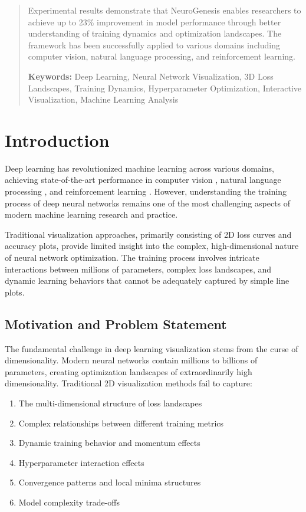 \documentclass[12pt,a4paper]{article}
\begin{document}
\begin{abstract}
Experimental results demonstrate that NeuroGenesis enables researchers to achieve up to 23\% improvement in model performance through better understanding of training dynamics and optimization landscapes. The framework has been successfully applied to various domains including computer vision, natural language processing, and reinforcement learning.

\textbf{Keywords:} Deep Learning, Neural Network Visualization, 3D Loss Landscapes, Training Dynamics, Hyperparameter Optimization, Interactive Visualization, Machine Learning Analysis
\end{abstract}

\section{Introduction}
\label{sec:introduction}

Deep learning has revolutionized machine learning across various domains, achieving state-of-the-art performance in computer vision \cite{he2016deep}, natural language processing \cite{devlin2019bert}, and reinforcement learning \cite{silver2017mastering}. However, understanding the training process of deep neural networks remains one of the most challenging aspects of modern machine learning research and practice.

Traditional visualization approaches, primarily consisting of 2D loss curves and accuracy plots, provide limited insight into the complex, high-dimensional nature of neural network optimization. The training process involves intricate interactions between millions of parameters, complex loss landscapes, and dynamic learning behaviors that cannot be adequately captured by simple line plots.

\subsection{Motivation and Problem Statement}

The fundamental challenge in deep learning visualization stems from the curse of dimensionality. Modern neural networks contain millions to billions of parameters, creating optimization landscapes of extraordinarily high dimensionality. Traditional 2D visualization methods fail to capture:

\begin{enumerate}
    \item The multi-dimensional structure of loss landscapes
    \item Complex relationships between different training metrics
    \item Dynamic training behavior and momentum effects
    \item Hyperparameter interaction effects
    \item Convergence patterns and local minima structures
    \item Model complexity trade-offs
\end{enumerate}
\end{document}
